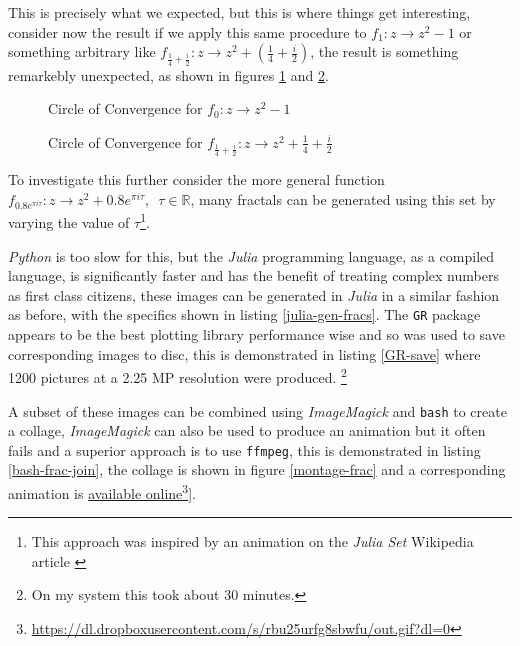 \documentclass[11pt]{article}
\begin{document}
This is precisely what we expected, but this is where things get interesting,
consider now the result if we apply this same procedure to \(f_{1}: z \rightarrow
z^{2} - 1\) or something arbitrary like \(f_{\frac{1}{4} + \frac{i}{2}}: z
\rightarrow z^{2} + (\frac{1}{4} + \frac{i}{2})\), the result is something
remarkebly unexpected, as shown in figures \ref{py-jl-1-plot} and \ref{py-jl-rab-plot}.


\begin{figure}[htbp]
\centering

\caption{\label{py-jl-1-plot}Circle of Convergence for \(f_{0}: z \rightarrow z^{2} - 1\)}
\end{figure}


\begin{figure}[htbp]
\centering

\caption{\label{py-jl-rab-plot}Circle of Convergence for \(f_{\frac{1}{4} + \frac{i}{2}}: z \rightarrow z^{2} + \frac{1}{4} + \frac{i}{2}\)}
\end{figure}

To investigate this further consider the
more general function \(f_{0.8 e^{\pi i \tau}}: z \rightarrow z^{2} + 0.8 e^{\pi
i \tau}, \enspace \tau \in \mathbb{R}\), many fractals can be generated using
this set by varying the value of \(\tau\)\footnote{This approach was inspired by an animation on the \emph{Julia Set} Wikipedia article \cite{JuliaSet2020}}.

\emph{Python} is too slow for this, but the \emph{Julia} programming language, as a
compiled language, is significantly faster and has the benefit of treating
complex numbers as first class citizens, these images can be generated in
\emph{Julia} in a similar fashion as before, with the specifics shown in listing
\ref{julia-gen-fracs}. The \texttt{GR} package appears to be the best plotting library
performance wise and so was used to save corresponding images to disc, this is
demonstrated in listing \ref{GR-save} where 1200 pictures at a 2.25 MP resolution were produced. \footnote{On my system this took about 30 minutes.}

A subset of these images can be combined using \emph{ImageMagick} and \texttt{bash} to
create a collage, \emph{ImageMagick} can also be used to produce an animation but it often
fails and a superior approach is to use \texttt{ffmpeg}, this is demonstrated in
listing \ref{bash-frac-join}, the collage is shown in figure \ref{montage-frac} and a corresponding
animation is \href{https://dl.dropboxusercontent.com/s/rbu25urfg8sbwfu/out.gif?dl=0}{available online}\footnote{\href{https://dl.dropboxusercontent.com/s/rbu25urfg8sbwfu/out.gif?dl=0}{https://dl.dropboxusercontent.com/s/rbu25urfg8sbwfu/out.gif?dl=0}}].
\end{document}
